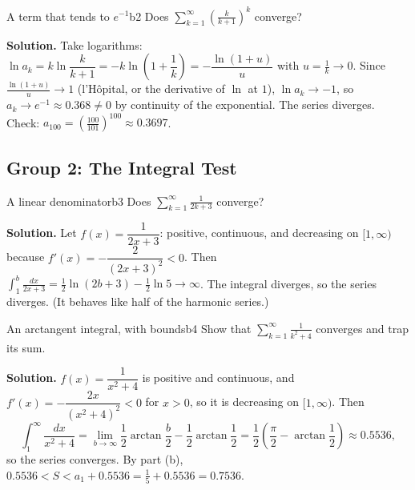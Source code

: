 \documentclass[11pt]{article}
\begin{document}
\begin{exmp}{A term that tends to $e^{-1}$}{b2}
Does $\displaystyle\sum_{k=1}^\infty\left(\frac k{k+1}\right)^k$ converge?

\textbf{Solution.} Take logarithms: $\ln a_k=k\ln\dfrac k{k+1}=-k\ln\left(1+\dfrac1k\right)=-\dfrac{\ln(1+u)}{u}$ with $u=\frac1k\to0$. Since $\frac{\ln(1+u)}u\to1$ (l'H\^opital, or the derivative of $\ln$ at $1$), $\ln a_k\to-1$, so $a_k\to e^{-1}\approx0.368\ne0$ by continuity of the exponential. The series diverges. Check: $a_{100}=\left(\frac{100}{101}\right)^{100}\approx0.3697$.
\end{exmp}

\subsection*{Group 2: The Integral Test}

\begin{exmp}{A linear denominator}{b3}
Does $\displaystyle\sum_{k=1}^\infty\frac1{2k+3}$ converge?

\textbf{Solution.} Let $f(x)=\dfrac1{2x+3}$: positive, continuous, and decreasing on $[1,\infty)$ because $f'(x)=-\dfrac2{(2x+3)^2}<0$. Then $\displaystyle\int_1^b\frac{dx}{2x+3}=\frac12\ln(2b+3)-\frac12\ln5\to\infty$. The integral diverges, so the series diverges. (It behaves like half of the harmonic series.)
\end{exmp}

\begin{exmp}{An arctangent integral, with bounds}{b4}
Show that $\displaystyle\sum_{k=1}^\infty\frac1{k^2+4}$ converges and trap its sum.

\textbf{Solution.} $f(x)=\dfrac1{x^2+4}$ is positive and continuous, and $f'(x)=-\dfrac{2x}{(x^2+4)^2}<0$ for $x>0$, so it is decreasing on $[1,\infty)$. Then
\[
\int_1^\infty\frac{dx}{x^2+4}=\lim_{b\to\infty}\frac12\arctan\frac b2-\frac12\arctan\frac12=\frac12\left(\frac\pi2-\arctan\frac12\right)\approx0.5536 ,
\]
so the series converges. By part (b), $0.5536<S<a_1+0.5536=\frac15+0.5536=0.7536$.
\end{exmp}
\end{document}
